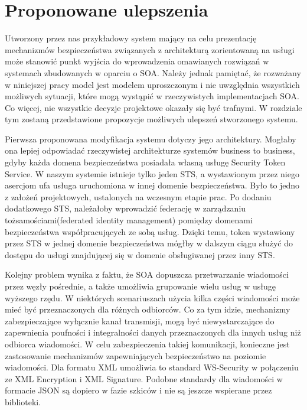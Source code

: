 
\section{Proponowane ulepszenia}
\label{sec:ulepszenia}

Utworzony przez nas przykładowy system mający na celu prezentację mechanizmów bezpieczeństwa związanych z architekturą zorientowaną na usługi może stanowić punkt wyjścia do wprowadzenia omawianych rozwiązań w systemach zbudowanych w oparciu o SOA. Należy jednak pamiętać, że rozważany w niniejszej pracy model jest modelem uproszczonym i nie uwzględnia wszystkich możliwych sytuacji, które mogą wystąpić w rzeczywistych implementacjach SOA. Co więcej, nie wszystkie decyzje projektowe okazały się być trafnymi. W rozdziale tym zostaną przedstawione propozycje możliwych ulepszeń stworzonego systemu.

Pierwsza proponowana modyfikacja systemu dotyczy jego architektury. Mogłaby ona lepiej odpowiadać rzeczywistej architekturze systemów business to business, gdyby każda domena bezpieczeństwa posiadała własną usługę Security Token Service. W naszym systemie istnieje tylko jeden STS, a wystawionym przez niego asercjom ufa usługa uruchomiona w innej domenie bezpieczeństwa. Było to jedno z założeń projektowych, ustalonych na wczesnym etapie prac. Po dodaniu dodatkowego STS, należałoby wprowadzić federację w zarządzaniu tożsamościami(federated identity management) pomiędzy domenami bezpieczeństwa współpracujących ze sobą usług. Dzięki temu, token wystawiony przez STS w jednej domenie bezpieczeństwa mógłby w dalszym ciągu służyć do dostępu do usługi znajdującej się w domenie obsługiwanej przez inny STS.

Kolejny problem wynika z faktu, że SOA dopuszcza przetwarzanie wiadomości przez węzły pośrednie, a także umożliwia grupowanie wielu usług w usługę wyższego rzędu. W niektórych scenariuszach użycia kilka części wiadomości może mieć być przeznaczonych dla różnych odbiorców. Co za tym idzie, mechanizmy zabezpieczające wyłącznie kanał transmisji, mogą być niewystarczające do zapewnienia poufności i integralności danych przeznaczonych dla innych usług niż odbiorca wiadomości. W celu zabezpieczenia takiej komunikacji, konieczne jest zastosowanie mechanizmów zapewniających bezpieczeństwo na poziomie wiadomości. Dla formatu XML umożliwia to standard WS-Security w połączeniu ze XML Encryption i XML Signature. Podobne standardy dla wiadomości w formacie JSON są dopiero w fazie szkiców\cite{JWE14}\cite{JWS14} i nie są jeszcze wspierane przez biblioteki.

